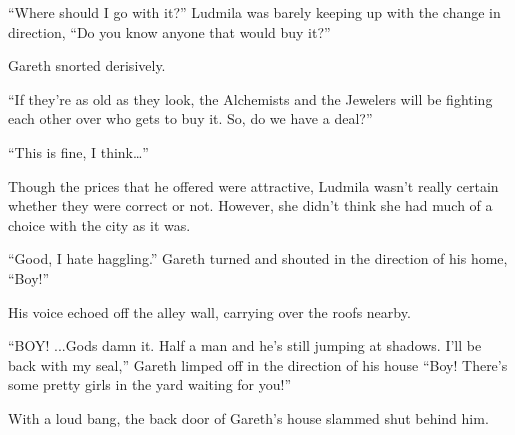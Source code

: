  

“Where should I go with it?” Ludmila was barely keeping up with the change in direction, “Do you know anyone that would buy it?”

 

Gareth snorted derisively.

 

“If they’re as old as they look, the Alchemists and the Jewelers will be fighting each other over who gets to buy it. So, do we have a deal?”

 

“This is fine, I think…”

 

Though the prices that he offered were attractive, Ludmila wasn’t really certain whether they were correct or not. However, she didn’t think she had much of a choice with the city as it was.

 

“Good, I hate haggling.” Gareth turned and shouted in the direction of his home, “Boy!”

 

His voice echoed off the alley wall, carrying over the roofs nearby.

 

“BOY! ...Gods damn it. Half a man and he’s still jumping at shadows. I’ll be back with my seal,” Gareth limped off in the direction of his house “Boy! There’s some pretty girls in the yard waiting for you!”

 

With a loud bang, the back door of Gareth’s house slammed shut behind him.